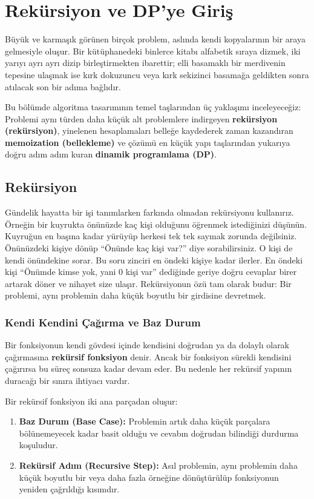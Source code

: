 \chapter[Rekürsiyon ve DP'ye Giriş · \textit{Orta}]{Rekürsiyon ve DP'ye Giriş}

Büyük ve karmaşık görünen birçok problem, aslında kendi kopyalarının bir araya gelmesiyle oluşur. Bir kütüphanedeki binlerce kitabı alfabetik sıraya dizmek, iki yarıyı ayrı ayrı dizip birleştirmekten ibarettir; elli basamaklı bir merdivenin tepesine ulaşmak ise kırk dokuzuncu veya kırk sekizinci basamağa geldikten sonra atılacak son bir adıma bağlıdır.

Bu bölümde algoritma tasarımının temel taşlarından üç yaklaşımı inceleyeceğiz: Problemi aynı türden daha küçük alt problemlere indirgeyen \textbf{rekürsiyon (rekürsiyon)}, yinelenen hesaplamaları belleğe kaydederek zaman kazandıran \textbf{memoization (bellekleme)} ve çözümü en küçük yapı taşlarından yukarıya doğru adım adım kuran \textbf{dinamik programlama (DP)}.

\section{Rekürsiyon}

Gündelik hayatta bir işi tanımlarken farkında olmadan rekürsiyonu kullanırız. Örneğin bir kuyrukta önünüzde kaç kişi olduğunu öğrenmek istediğinizi düşünün. Kuyruğun en başına kadar yürüyüp herkesi tek tek saymak zorunda değilsiniz. Önünüzdeki kişiye dönüp ``Önünde kaç kişi var?'' diye sorabilirsiniz. O kişi de kendi önündekine sorar. Bu soru zinciri en öndeki kişiye kadar ilerler. En öndeki kişi ``Önümde kimse yok, yani 0 kişi var'' dediğinde geriye doğru cevaplar birer artarak döner ve nihayet size ulaşır. Rekürsiyonun özü tam olarak budur: Bir problemi, aynı problemin daha küçük boyutlu bir girdisine devretmek.

\subsection{Kendi Kendini Çağırma ve Baz Durum}

Bir fonksiyonun kendi gövdesi içinde kendisini doğrudan ya da dolaylı olarak çağırmasına \textbf{rekürsif fonksiyon} denir. Ancak bir fonksiyon sürekli kendisini çağırırsa bu süreç sonsuza kadar devam eder. Bu nedenle her rekürsif yapının duracağı bir sınıra ihtiyacı vardır.

\begin{definition}
Bir rekürsif fonksiyon iki ana parçadan oluşur:
\begin{enumerate}
    \item \textbf{Baz Durum (Base Case):} Problemin artık daha küçük parçalara bölünemeyecek kadar basit olduğu ve cevabın doğrudan bilindiği durdurma koşuludur.
    \item \textbf{Rekürsif Adım (Recursive Step):} Asıl problemin, aynı problemin daha küçük boyutlu bir veya daha fazla örneğine dönüştürülüp fonksiyonun yeniden çağrıldığı kısımdır.
\end{enumerate}
\end{definition}

